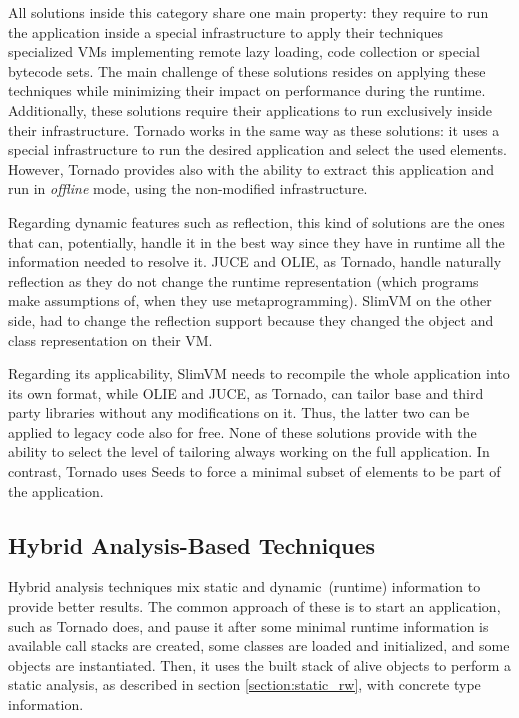 All solutions inside this category share one main property: they require to run the application inside a special infrastructure to apply their techniques \eg specialized VMs implementing remote lazy loading, code collection or special bytecode sets. The main challenge of these solutions resides on applying these techniques while minimizing their impact on performance during the runtime. Additionally, these solutions require their applications to run exclusively inside their infrastructure. Tornado works in the same way as these solutions: it uses a special infrastructure to run the desired application and select the used elements.  However, Tornado provides also with the ability to extract this application and run in \emph{offline} mode, using the non-modified infrastructure.

Regarding dynamic features such as reflection, this kind of solutions are the ones that can, potentially, handle it in the best way since they have in runtime all the information needed to resolve it. JUCE and OLIE, as Tornado, handle naturally reflection as they do not change the runtime representation (which programs make assumptions of, when they use metaprogramming). SlimVM on the other side, had to change the reflection support because they changed the object and class representation on their VM.

Regarding its applicability, SlimVM needs to recompile the whole application into its own format, while OLIE and JUCE, as Tornado, can tailor base and third party libraries without any modifications on it. Thus, the latter two can be applied to legacy code also for free. None of these solutions provide with the ability to select the level of tailoring always working on the full application. In contrast, Tornado uses Seeds to force a minimal subset of elements to be part of the application.


\subsection{Hybrid Analysis-Based Techniques}\label{section:hybrid_rw}

Hybrid analysis techniques mix static and dynamic~(\ie runtime) information to provide better results. The common approach of these is to start an application, such as Tornado does, and pause it after some minimal runtime information is available \ie call stacks are created, some classes are loaded and initialized, and some objects are instantiated. Then, it uses the built stack of alive objects to perform a static analysis, as described in section \ref{section:static_rw}, with concrete type information.

